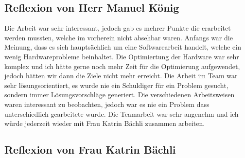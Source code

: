 \subsection{Reflexion von Herr Manuel König}
Die Arbeit war sehr interessant, jedoch gab es mehrer Punkte die erarbeitet werden mussten, welche im vorherein nicht absehbar waren. Anfangs war die Meinung, dass es sich hauptsächlich um eine Softwarearbeit handelt, welche ein wenig Hardwareprobleme beinhaltet. Die Optimiertung der Hardware war sehr komplex und ich hätte gerne noch mehr Zeit für die Optimierung aufgewendet, jedoch hätten wir dann die Ziele nicht mehr erreicht. Die Arbeit im Team war sehr lösungsorientiert, es wurde nie ein Schuldiger für ein Problem gesucht, sondern immer Lösungsvorschläge generiert. Die verschiedenen Arbeitsweisen waren interessant zu beobachten, jedoch war es nie ein Problem dass unterschiedlich gearbeitete wurde. Die Teamarbeit war sehr angenehm und ich würde jederzeit wieder mit Frau Katrin Bächli zusammen arbeiten.

\subsection{Reflexion von Frau Katrin Bächli}


%
%
%
%
%
%
%
%
%
%
%
%
%
%
%



